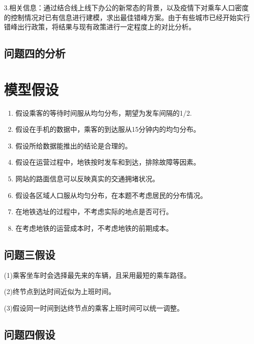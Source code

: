 \documentclass[12pt,a4paper]{mcmthesis}
\begin{document}
    3.相关信息：通过结合线上线下办公的新常态的背景，以及疫情下对乘车人口密度的控制情况对已有信息进行建模，求出最佳错峰方案。由于有些城市已经开始实行错峰出行政策，将结果与现有政策进行一定程度上的对比分析。

    \subsection{问题四的分析}


    \section{模型假设}

    \begin{enumerate}
        \item 假设乘客的等待时间服从均匀分布，期望为发车间隔的1/2.
        \item 假设在手机的数据中，乘客的到达服从15分钟内的均匀分布。
        \item 假设所给数据能推出的结论是合理的。
        \item 假设在运营过程中，地铁按时发车和到达，排除故障等因素。
        \item 网站的路面信息可以反映真实的交通拥堵状况。
        \item 假设各区域人口服从均匀分布，在本题不考虑居民的分布情况。
        \item 在地铁选址的过程中，不考虑实际的地点是否可行。
        \item 在考虑地铁的运营成本时，不考虑地铁的前期成本。

    \end{enumerate}

    \subsection{问题三假设}

    (1)乘客坐车时会选择最先来的车辆，且采用最短的乘车路径。

    (2)终节点到达时间近似为上班时间。

    (3)假设同一时间到达终节点的乘客上班时间可以统一调整。

    \subsection{问题四假设}
\end{document}
